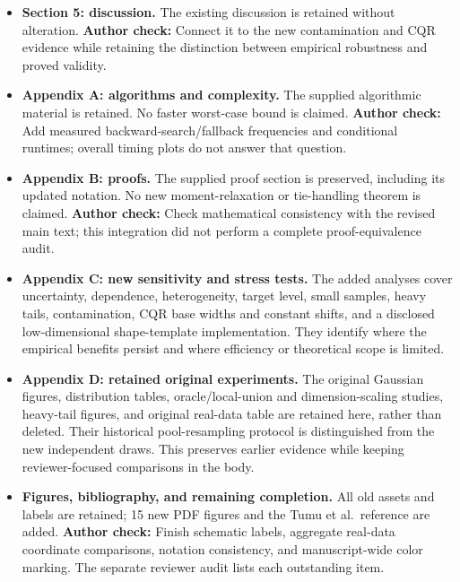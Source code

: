 \documentclass[10pt]{article}
\newcommand{\checkauthor}[1]{\textcolor{red!65!black}{\textbf{Author check:} #1}}
\begin{document}
\begin{itemize}
\item \textbf{Section 5: discussion.}
The existing discussion is retained without alteration.
\checkauthor{Connect it to the new contamination and CQR evidence while
retaining the distinction between empirical robustness and proved validity.}

\item \textbf{Appendix A: algorithms and complexity.}
The supplied algorithmic material is retained. No faster worst-case bound is
claimed. \checkauthor{Add measured backward-search/fallback frequencies and
conditional runtimes;} overall timing plots do not answer that question.

\item \textbf{Appendix B: proofs.}
The supplied proof section is preserved, including its updated notation.
No new moment-relaxation or tie-handling theorem is claimed.
\checkauthor{Check mathematical consistency with the revised main text; this
integration did not perform a complete proof-equivalence audit.}

\item \textbf{Appendix C: new sensitivity and stress tests.}
The added analyses cover uncertainty, dependence, heterogeneity, target level,
small samples, heavy tails, contamination, CQR base widths and constant shifts,
and a disclosed low-dimensional shape-template implementation. They identify
where the empirical benefits persist and where efficiency or theoretical
scope is limited.

\item \textbf{Appendix D: retained original experiments.}
The original Gaussian figures, distribution tables, oracle/local-union and
dimension-scaling studies, heavy-tail figures, and original real-data table
are retained here, rather than deleted. Their historical pool-resampling
protocol is distinguished from the new independent draws. This preserves
earlier evidence while keeping reviewer-focused comparisons in the body.

\item \textbf{Figures, bibliography, and remaining completion.}
All old assets and labels are retained; 15 new PDF figures and the Tumu et al.\
reference are added. \checkauthor{Finish schematic labels, aggregate real-data
coordinate comparisons, notation consistency, and manuscript-wide color
marking.} The separate reviewer audit lists each outstanding item.
\end{itemize}
\end{document}
